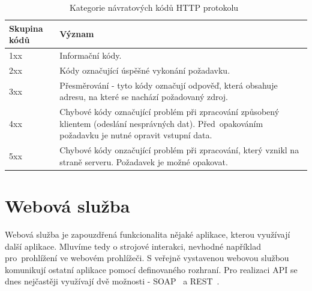 \begin{table}[ht!]
  \centering
  \begin{tabular}{|l|p{9cm}|}
    \hline
    \textbf{Skupina kódů} & \textbf{Význam}\\
    \hline
    1xx & Informační kódy.\\
    \hline
    2xx & Kódy označující úspěšné vykonání požadavku.\\
    \hline
    3xx & Přesměrování - tyto kódy označují odpověď, která obsahuje adresu, na které se nachází požadovaný zdroj.\\
    \hline
    4xx & Chybové kódy označující problém při zpracování způsobený klientem (odeslání nesprávných dat). Před~opakováním požadavku je nutné opravit vstupní data.\\
    \hline
    5xx & Chybové kódy onzačující problém při zpracování, který vznikl na straně serveru. Požadavek je možné opakovat.\\
    \hline
  \end{tabular}
  \caption{Kategorie návratových kódů HTTP protokolu~\cite{rest_vse}}
  \label{tab:http_kody}
\end{table}
  
\section{Webová služba}
  
Webová služba je zapouzdřená funkcionalita nějaké aplikace, kterou využívají další aplikace.
Mluvíme tedy o strojové interakci, nevhodné například pro~prohlížení ve webovém prohlížeči.
S veřejně vystavenou webovou službou komunikují ostatní aplikace pomocí definovaného rozhraní.
Pro realizaci API se dnes nejčastěji využívají dvě možnosti - SOAP~\cite{soap} a REST~\cite{rest}.